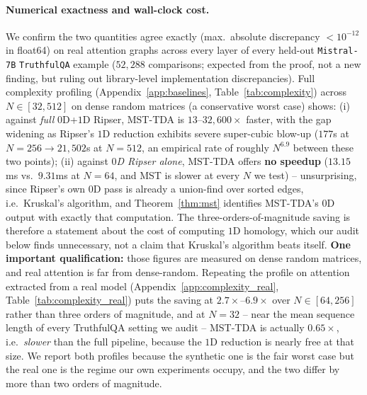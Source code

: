 \documentclass{article}
\begin{document}
\paragraph{Numerical exactness and wall-clock cost.} We confirm the two quantities agree exactly (max.\ absolute discrepancy $<10^{-12}$ in float64) on real attention graphs across every layer of every held-out \texttt{Mistral-7B} \texttt{TruthfulQA} example ($52{,}288$ comparisons; expected from the proof, not a new finding, but ruling out library-level implementation discrepancies). Full complexity profiling (Appendix~\ref{app:baselines}, Table~\ref{tab:complexity}) across $N \in [32, 512]$ on dense random matrices (a conservative worst case) shows: (i) against \emph{full} $0$D+$1$D Ripser, MST-TDA is $13$--$32{,}600\times$ faster, with the gap widening as Ripser's $1$D reduction exhibits severe super-cubic blow-up ($177$s at $N{=}256 \to 21{,}502$s at $N{=}512$, an empirical rate of roughly $N^{6.9}$ between these two points); (ii) against \emph{$0$D Ripser alone}, MST-TDA offers \textbf{no speedup} ($13.15$ms vs.\ $9.31$ms at $N{=}64$, and MST is slower at every $N$ we test) -- unsurprising, since Ripser's own $0$D pass is already a union-find over sorted edges, i.e.\ Kruskal's algorithm, and Theorem~\ref{thm:mst} identifies MST-TDA's $0$D output with exactly that computation. The three-orders-of-magnitude saving is therefore a statement about the cost of computing $1$D homology, which our audit below finds unnecessary, not a claim that Kruskal's algorithm beats itself. \textbf{One important qualification:} those figures are measured on dense random matrices, and real attention is far from dense-random. Repeating the profile on attention extracted from a real model (Appendix~\ref{app:complexity_real}, Table~\ref{tab:complexity_real}) puts the saving at $2.7\times$--$6.9\times$ over $N \in [64,256]$ rather than three orders of magnitude, and at $N{=}32$ -- near the mean sequence length of every TruthfulQA setting we audit -- MST-TDA is actually $0.65\times$, i.e.\ \emph{slower} than the full pipeline, because the $1$D reduction is nearly free at that size. We report both profiles because the synthetic one is the fair worst case but the real one is the regime our own experiments occupy, and the two differ by more than two orders of magnitude.
\end{document}
